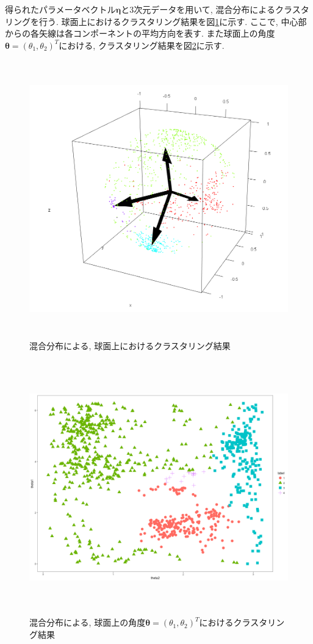 \documentclass[a4j,12pt]{jarticle}
\begin{document}
得られたパラメータベクトル$\bm \eta$と$3$次元データを用いて, 混合分布によるクラスタリングを行う. 球面上におけるクラスタリング結果を図\ref{clusterplot3d}に示す. ここで, 中心部からの各矢線は各コンポーネントの平均方向を表す. また球面上の角度$\bm \theta = (\theta_1, \theta_2)^T$における, クラスタリング結果を図\ref{clusterplot2d}に示す.

\begin{figure}[tbp]
\begin{center}
\includegraphics[clip,height= 120mm]{data/cluster_3d.png}
\end{center}
\caption{混合分布による, 球面上におけるクラスタリング結果}
\label{clusterplot3d}
\end{figure}

\begin{figure}[tbp]
\begin{center}
\includegraphics[clip,height= 110mm]{data/cluster_4.png}
\end{center}
\caption{混合分布による, 球面上の角度$\bm \theta = (\theta_1, \theta_2)^T$におけるクラスタリング結果}
\label{clusterplot2d}
\end{figure}
\end{document}
